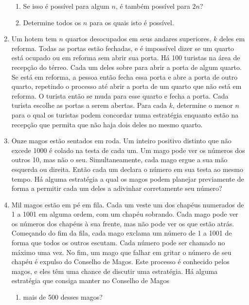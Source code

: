 \documentclass{article}
\begin{document}
\begin{enumerate}
    \begin{enumerate}
    \item Se isso é possível para algum $n$, é também possível para $2n$?
    
    \item Determine todos os $n$ para os quais isto é possível.
    \end{enumerate}
    
    \item Um hotem tem $n$ quartos desocupados em seus andares superiores, $k$ deles em reforma. Todas as portas estão fechadas, e é impossível dizer se um quarto está ocupado ou em reforma sem abrir sua porta. Há 100 turistas na área de recepção do térreo. Cada um deles sobre para abrir a porta de algum quarto. Se está em reforma, a pessoa então fecha essa porta e abre a porta de outro quarto, repetindo o processo até abrir a porta de um quarto que não está em reforma. O turista então se muda para esse quarto e fecha a porta. Cada turista escolhe as portas a serem abertas. Para cada $k$, determine o menor $n$ para o qual os turistas podem concordar numa estratégia enquanto estão na recepção que permita que não haja dois deles no mesmo quarto.
    
    \item Onze magos estão sentados em roda. Um inteiro positivo distinto que não excede 1000 é colado na testa de cada um. Um mago pode ver os números dos outros 10, mas não o seu. Simultaneamente, cada mago ergue a sua mão esquerda ou direita. Então cada um declara o número em sua testa ao mesmo tempo. Há alguma estratégia a qual os magos podem planejar previamente de forma a permitir cada um deles a adivinhar corretamente seu número?
    
    \item Mil magos estão em pé em fila. Cada um veste um dos chapéus numerados de 1 a 1001 em alguma ordem, com um chapéu sobrando. Cada mago pode ver os números dos chapéus à sua frente, mas não pode ver os que estão atrás. Começando do fim da fila, cada mago exclama um número de 1 a 1001 de forma que todos os outros escutam. Cada número pode ser chamado no máximo uma vez. No fim, um mago que falhar em gritar o número de seu chapéu é expulso do Conselho de Magos. Este processo é conhecido pelos magos, e eles têm uma chance de discutir uma estratégia. Há alguma estratégia que consiga manter no Conselho de Magos
    
    \begin{enumerate}
    \item mais de 500 desses magos?
    

\end{enumerate}
\end{enumerate}
\end{document}
